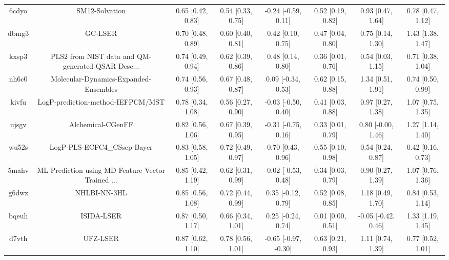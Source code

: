 \documentclass{article}
\begin{document}
\begin{center}
\begin{longtable}{|cccccccc|}
 6cdyo &                                     SM12-Solvation &  0.65 [0.42, 0.83] &  0.54 [0.33, 0.75] &   -0.24 [-0.59, 0.11] &  0.52 [0.19, 0.82] &    0.93 [0.47, 1.64] &     0.78 [0.47, 1.12] \\
 dbmg3 &                                            GC-LSER &  0.70 [0.48, 0.89] &  0.60 [0.40, 0.81] &     0.42 [0.10, 0.75] &  0.47 [0.04, 0.80] &    0.75 [0.14, 1.30] &     1.43 [1.38, 1.47] \\
 kxsp3 &  PLS2 from NIST data and QM-generated QSAR Desc... &  0.74 [0.49, 0.94] &  0.62 [0.39, 0.86] &     0.48 [0.14, 0.80] &  0.36 [0.01, 0.76] &    0.54 [0.03, 1.15] &     0.71 [0.38, 1.04] \\
 nh6c0 &              Molecular-Dynamics-Expanded-Ensembles &  0.74 [0.56, 0.93] &  0.67 [0.48, 0.87] &    0.09 [-0.34, 0.53] &  0.62 [0.15, 0.88] &    1.34 [0.51, 1.91] &     0.74 [0.50, 0.99] \\
 kivfu &                  LogP-prediction-method-IEFPCM/MST &  0.78 [0.34, 1.08] &  0.56 [0.27, 0.90] &   -0.03 [-0.50, 0.40] &  0.41 [0.03, 0.88] &    0.97 [0.27, 1.38] &     1.07 [0.75, 1.35] \\
 ujsgv &                                  Alchemical-CGenFF &  0.82 [0.56, 1.06] &  0.67 [0.39, 0.95] &   -0.31 [-0.75, 0.16] &  0.33 [0.01, 0.79] &   0.80 [-0.00, 1.46] &     1.27 [1.14, 1.40] \\
 wu52s &                        LogP-PLS-ECFC4\_CSsep-Bayer &  0.83 [0.58, 1.05] &  0.72 [0.49, 0.97] &     0.70 [0.43, 0.96] &  0.55 [0.10, 0.98] &    0.54 [0.24, 0.87] &     0.42 [0.16, 0.73] \\
 5mahv &  ML Prediction using MD Feature Vector Trained ... &  0.85 [0.42, 1.19] &  0.62 [0.31, 0.99] &   -0.02 [-0.53, 0.48] &  0.34 [0.03, 0.79] &    0.90 [0.27, 1.39] &     1.07 [0.76, 1.36] \\
 g6dwz &                                       NHLBI-NN-3HL &  0.85 [0.56, 1.08] &  0.72 [0.44, 0.99] &    0.35 [-0.12, 0.79] &  0.52 [0.08, 0.85] &    1.18 [0.49, 1.70] &     0.84 [0.53, 1.14] \\
 bqeuh &                                         ISIDA-LSER &  0.87 [0.50, 1.17] &  0.66 [0.34, 1.01] &    0.25 [-0.24, 0.74] &  0.01 [0.00, 0.51] &  -0.05 [-0.42, 0.46] &     1.33 [1.19, 1.45] \\
 d7vth &                                           UFZ-LSER &  0.87 [0.62, 1.10] &  0.78 [0.56, 1.01] &  -0.65 [-0.97, -0.30] &  0.63 [0.21, 0.93] &    1.11 [0.74, 1.39] &     0.77 [0.52, 1.01] \\

\end{longtable}
\end{center}
\end{document}
